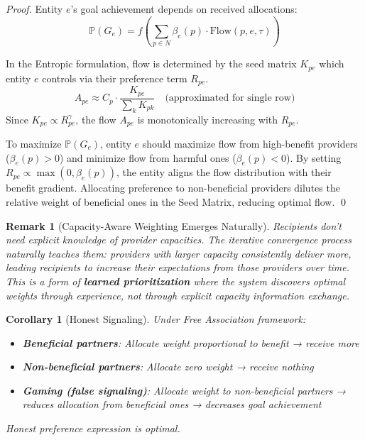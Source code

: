 \documentclass[11pt]{article}
\newtheorem{corollary}{Corollary}
\newtheorem{remark}{Remark}
\begin{document}
\begin{proof}
Entity $e$'s goal achievement depends on received allocations:
\[
\mathbb{P}(G_e) = f\left(\sum_{p \in N} \beta_e(p) \cdot \text{Flow}(p, e, \tau)\right)
\]

In the Entropic formulation, flow is determined by the seed matrix $K_{pe}$ which entity $e$ controls via their preference term $R_{pe}$.
\[
A_{pe} \approx C_p \cdot \frac{K_{pe}}{\sum_k K_{pk}} \quad \text{(approximated for single row)}
\]
Since $K_{pe} \propto R_{pe}^\gamma$, the flow $A_{pe}$ is monotonically increasing with $R_{pe}$.

To maximize $\mathbb{P}(G_e)$, entity $e$ should maximize flow from high-benefit providers ($\beta_e(p) > 0$) and minimize flow from harmful ones ($\beta_e(p) < 0$).
By setting $R_{pe} \propto \max(0, \beta_e(p))$, the entity aligns the flow distribution with their benefit gradient. Allocating preference to non-beneficial providers dilutes the relative weight of beneficial ones in the Seed Matrix, reducing optimal flow. \qed
\end{proof}

\begin{remark}[Capacity-Aware Weighting Emerges Naturally]
Recipients don't need explicit knowledge of provider capacities. The iterative convergence process naturally teaches them: providers with larger capacity consistently deliver more, leading recipients to increase their expectations from those providers over time. This is a form of \textbf{learned prioritization} where the system discovers optimal weights through experience, not through explicit capacity information exchange.
\end{remark}

\begin{corollary}[Honest Signaling]
Under Free Association framework:
\begin{itemize}
\item \textbf{Beneficial partners}: Allocate weight proportional to benefit → receive more
\item \textbf{Non-beneficial partners}: Allocate zero weight → receive nothing
\item \textbf{Gaming (false signaling)}: Allocate weight to non-beneficial partners → reduces allocation from beneficial ones → decreases goal achievement
\end{itemize}

Honest preference expression is optimal.
\end{corollary}
\end{document}
